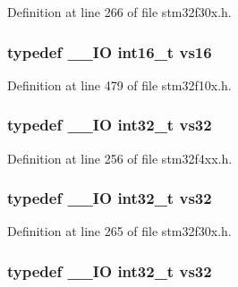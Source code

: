 Definition at line 266 of file stm32f30x.\-h.

\hypertarget{group___exported__types_ga19c9450d60abff7c6d3d35f31c10f83e}{
\subsubsection[{vs16}]{\setlength{\rightskip}{0pt plus 5cm}typedef \-\_\-\-\_\-\-I\-O {\bf int16\-\_\-t} {\bf vs16}}}\label{group___exported__types_ga19c9450d60abff7c6d3d35f31c10f83e}


Definition at line 479 of file stm32f10x.\-h.

\hypertarget{group___exported__types_ga476e2cb441f8e689433350ae2eeee510}{
\subsubsection[{vs32}]{\setlength{\rightskip}{0pt plus 5cm}typedef \-\_\-\-\_\-\-I\-O {\bf int32\-\_\-t} {\bf vs32}}}\label{group___exported__types_ga476e2cb441f8e689433350ae2eeee510}


Definition at line 256 of file stm32f4xx.\-h.

\hypertarget{group___exported__types_ga476e2cb441f8e689433350ae2eeee510}{
\subsubsection[{vs32}]{\setlength{\rightskip}{0pt plus 5cm}typedef \-\_\-\-\_\-\-I\-O {\bf int32\-\_\-t} {\bf vs32}}}\label{group___exported__types_ga476e2cb441f8e689433350ae2eeee510}


Definition at line 265 of file stm32f30x.\-h.

\hypertarget{group___exported__types_ga476e2cb441f8e689433350ae2eeee510}{
\subsubsection[{vs32}]{\setlength{\rightskip}{0pt plus 5cm}typedef \-\_\-\-\_\-\-I\-O {\bf int32\-\_\-t} {\bf vs32}}}\label{group___exported__types_ga476e2cb441f8e689433350ae2eeee510}


